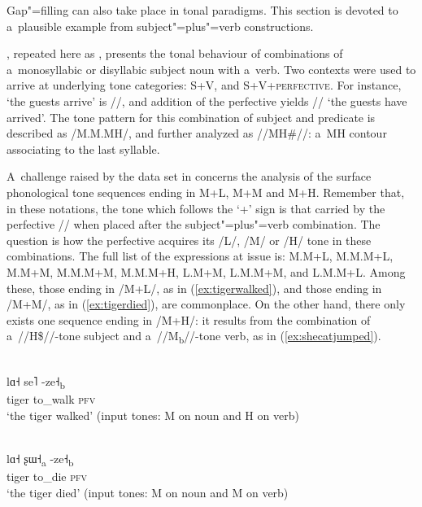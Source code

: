 Gap"=filling can also take place in tonal paradigms. This section is devoted to a~plausible example from subject"=plus"=verb constructions. 

, repeated here as , presents the tonal behaviour of combinations of a~monosyllabic or disyllabic subject noun with a~verb. Two contexts were used to arrive at underlying tone categories: S+V, and
S+V+\textsc{perfective}. For instance, ‘the guests arrive’ is //, and addition of the {perfective} yields // ‘the guests have arrived’. The tone pattern for this combination of subject and predicate is described as /M.M.MH/, and further analyzed as \mbox{//MH\#//}: a~MH contour associating to the last
syllable.

A~challenge raised by the data set in  concerns the analysis of the surface phonological tone sequences ending in M+L, M+M and M+H. Remember that, in these notations, the tone which follows the ‘+’ sign is that carried by the {perfective} \mbox{//} when placed after the subject"=plus"=verb combination. The {question} is how the {perfective} acquires its /L/, /M/ or /H/ tone in these combinations. The full list of the expressions at issue is: M.M+L, M.M.M+L, M.M+M, M.M.M+M, M.M.M+H, L.M+M, L.M.M+M, and L.M.M+L. Among these, those
ending in /M+L/, as in (\ref{ex:tigerwalked}), and those ending in /M+M/, as in (\ref{ex:tigerdied}), are commonplace. On the other hand, there only exists one sequence ending in /M+H/: it results from the
combination of a~\mbox{//H\$//}-tone subject and a~\mbox{//M\textsubscript{b}//}-tone verb, as in (\ref{ex:shecatjumped}). 

\begin{exe}
	\ex
	\label{ex:tigerwalked}
	\\ 
	\gll lɑ˧		se˥		-ze˧\textsubscript{b}\\
	tiger	to\_walk	\textsc{pfv}\\
	\glt ‘the tiger walked’ (input tones: M on noun and H on verb)
\end{exe}

\begin{exe}
	\ex
	\label{ex:tigerdied}
	\\ 
		\gll lɑ˧		ʂɯ˧\textsubscript{a}		-ze˧\textsubscript{b}\\
		tiger	to\_die		\textsc{pfv}\\
		\glt ‘the tiger died’ (input tones: M on noun and M on verb)
\end{exe}
	
